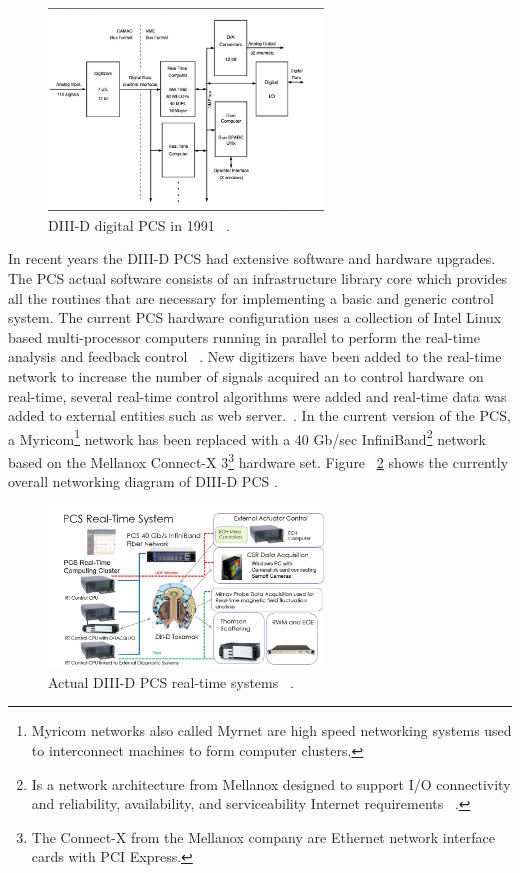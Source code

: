 \begin{figure}[htbp]
	\centering
	\includegraphics[width=0.65\textwidth]{Chp2/DIIDPCS_old.png}
	\caption{\label{DIII1991} DIII-D digital PCS in 1991 ~\cite{DIIDcontrol}.  }
\end{figure}

In recent years the DIII-D PCS had extensive software and hardware upgrades. The PCS actual software consists of an infrastructure library core which provides all the routines that are necessary for implementing a basic and generic control system. The current  PCS hardware configuration uses a collection of  Intel Linux based multi-processor computers running in parallel to perform the real-time analysis and feedback control ~\cite{DIIID2013}. New digitizers have been added to the real-time network to increase the number of signals acquired an to control hardware on real-time, several real-time control algorithms were added and real-time data was added to external entities such as web server.~\cite{DIIIDnew}. In the current version of the PCS, a Myricom\footnote{Myricom networks also called Myrnet are high speed networking systems used to interconnect machines to form computer clusters. } network has been replaced with a 40 Gb/sec InfiniBand\footnote{Is a network architecture from Mellanox designed to support I/O connectivity  and  reliability, availability, and serviceability Internet requirements ~\cite{MellanoxTechnologies2003}.  } network based on the Mellanox Connect-X 3\footnote{The Connect-X from the Mellanox company are Ethernet network interface cards with PCI Express.} hardware set. Figure ~\ref{DIIInew} shows the currently overall networking diagram of DIII-D PCS .


\begin{figure}[htbp]
	\centering
	\includegraphics[width=0.65\textwidth]{Chp2/DIIIDPCSnew.PNG}
	\caption{\label{DIIInew} Actual DIII-D PCS real-time systems ~\cite{DIIIDnew}.  }
\end{figure}


